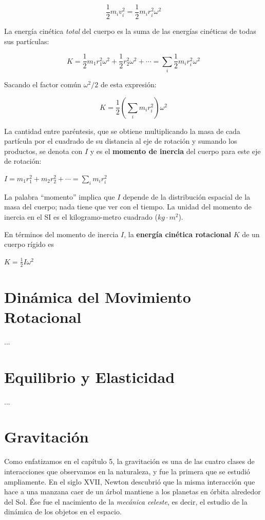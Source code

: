 \documentclass{article}
\newcommand{\newsection}[1]{
    \pagebreak
    {\color{sectionColor}
    \centering
    \section{\bl{#1}}}
    \color{black}
    \vspace{0.5cm}
}
\newcommand{\bl}[1]{\textbf{#1}}
\newcommand{\definicion}[1]{%
    \vspace{0.5cm}
    \begin{definicionbox}
        #1
    \end{definicionbox}
    \vspace{0.5cm}
}
\begin{document}
    \[ \frac{1}{2} m_i v_i^2 = \frac{1}{2} m_i r_i^2 \omega^2 \]

    \par La energía cinética \textit{total} del cuerpo es la suma de las energías cinéticas de todas sus partículas:

    \[ K = \frac{1}{2} m_1 r_1^2 \omega^2 + \frac{1}{2} r_2^2 \omega^2 + \cdots = \sum_{i}^{} \frac{1}{2} m_i r_i^2 \omega^2 \]

    \par Sacando el factor común $\omega^2/2$ de esta expresión:
    
    \[ K = \frac{1}{2} \left(\sum_{i}^{} m_i r_i^2\right)  \omega^2 \]

    \par La cantidad entre paréntesis, que se obtiene multiplicando la masa de cada partícula por el cuadrado de su distancia al eje de rotación y sumando los productos, se denota con $I$ y es el \bl{momento de inercia} del cuerpo para este eje de rotación:

    \definicion{
        \centering
        \( I = m_1 r_1^2 + m_2 r_2^2 + \cdots = \sum_{i}^{} m_i r_i^2 \)
    }

    \par La palabra “momento” implica que $I$ depende de la distribución espacial de la masa del cuerpo; nada tiene que ver con el tiempo. La unidad del momento de inercia en el SI es el kilogramo-metro cuadrado ($kg \cdot m^2$).

    \par En términos del momento de inercia $I$, la \bl{energía cinética rotacional} $K$ de un cuerpo rígido es

    \definicion{
        \centering
        \( K = \frac{1}{2} I \omega^2 \)
    }

    \newsection{Dinámica del Movimiento Rotacional}

    \par ... %

    \newsection{Equilibrio y Elasticidad}

    \par ... %

    \newsection{Gravitación}

    \par Como enfatizamos en el capítulo 5, la gravitación es una de las cuatro clases de interacciones que observamos en la naturaleza, y fue la primera que se estudió ampliamente. En el siglo XVII, Newton descubrió que la misma interacción que hace a una manzana caer de un árbol mantiene a los planetas en órbita alrededor del Sol. Ése fue el nacimiento de la \textit{mecánica celeste}, es decir, el estudio de la dinámica de los objetos en el espacio.
\end{document}
